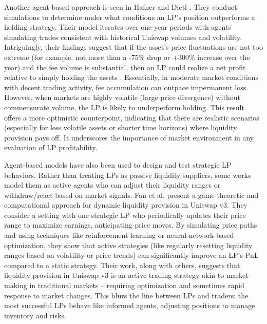 \documentclass[11pt]{article}
\begin{document}
Another agent-based approach is seen in Hafner and Dietl \cite{hafner2024}. They conduct simulations to determine under what conditions an LP’s position outperforms a holding strategy. Their model iterates over one-year periods with agents simulating trades consistent with historical Uniswap volumes and volatility. Intriguingly, their findings suggest that if the asset’s price fluctuations are not too extreme (for example, not more than a -75\% drop or +300\% increase over the year) and the fee volume is substantial, then an LP could realize a net profit relative to simply holding the assets \cite{hafner2024}. Essentially, in moderate market conditions with decent trading activity, fee accumulation can outpace impermanent loss. However, when markets are highly volatile (large price divergence) without commensurate volume, the LP is likely to underperform holding. This result offers a more optimistic counterpoint, indicating that there are realistic scenarios (especially for less volatile assets or shorter time horizons) where liquidity provision pays off. It underscores the importance of market environment in any evaluation of LP profitability.

Agent-based models have also been used to design and test strategic LP behaviors. Rather than treating LPs as passive liquidity suppliers, some works model them as active agents who can adjust their liquidity ranges or withdraw/react based on market signals. Fan et al. \cite{fan2023} present a game-theoretic and computational approach for dynamic liquidity provision in Uniswap v3. They consider a setting with one strategic LP who periodically updates their price range to maximize earnings, anticipating price moves. By simulating price paths and using techniques like reinforcement learning or neural-network-based optimization, they show that active strategies (like regularly resetting liquidity ranges based on volatility or price trends) can significantly improve an LP’s PnL compared to a static strategy. Their work, along with others, suggests that liquidity provision in Uniswap v3 is an active trading strategy akin to market-making in traditional markets – requiring optimization and sometimes rapid response to market changes. This blurs the line between LPs and traders: the most successful LPs behave like informed agents, adjusting positions to manage inventory and risks.
\end{document}
